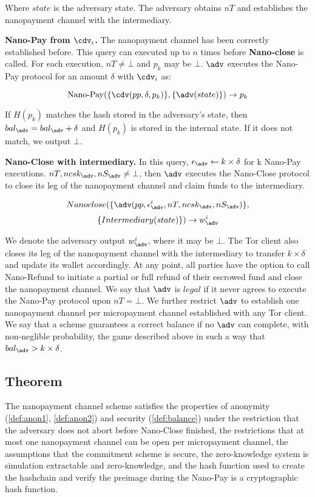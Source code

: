 Where $state$ is the adversary state.
The adversary obtains $nT$ and establishes the nanopayment channel with the intermediary.

\textbf{Nano-Pay from $\cdv_i$.}
The nanopayment channel has been correctly established before.
This query can executed up to $n$ times before \textbf{Nano-close} is called.
For each execution, $nT \neq \bot$ and $p_k$ may be $\bot$.
$\adv$ executes the Nano-Pay protocol for an amount $\delta$ with $\cdv_i$ as:

$$\operatorname{Nano-Pay}(\{\cdv(pp,\delta,p_k)\},\{\adv(state)\}) \rightarrow p_k$$

If $H(p_k)$ matches the hash stored in the adversary's state, then $bal_\adv = bal_\adv+\delta$ and $H(p_k)$ is stored in the internal state.
If it does not match, we output $\bot$.

\textbf{Nano-Close with intermediary.}
In this query, $\epsilon_\adv \leftarrow k \times \delta$ for k Nano-Pay executions.
$nT, ncsk_\adv, nS_\adv \neq \bot$, then $\adv$ executes the Nano-Close protocol to close its leg of the nanopayment channel and claim funds to the intermediary.

$$Nano\-close(\{\adv(pp, \epsilon^i_\adv, nT, ncsk_\adv, nS_\adv)\},$$ $$\{Intermediary(state)\}) \rightarrow w^i_\adv$$

We denote the adversary output $w^i_\adv$, where it may be $\bot$.
The Tor client also closes its leg of the nanopayment channel with the intermediary to transfer $k \times \delta$ and update its wallet accordingly.
At any point, all parties have the option to call Nano-Refund to initiate a partial or full refund of their escrowed fund and close the nanopayment channel.
We say that $\adv$ is $legal$ if it never agrees to execute the Nano-Pay protocol upon $nT = \bot$.
We further restrict $\adv$ to establish one nanopayment channel per micropayment channel established with any Tor client.
We say that a scheme guarantees a correct balance if no $\adv$ can complete, with non-neglible probability, the game described above in such a way that $bal_\adv > k \times \delta$.

\subsection{Theorem}

The nanopayment channel scheme satisfies the properties of anonymity (\ref{def:anon1}, \ref{def:anon2}) and security (\ref{def:balance}) under the restriction that the adversary does not abort before Nano-Close finished, the restrictions that at most one nanopayment channel can be open per micropayment channel, the assumptions that the commitment scheme is secure, the zero-knowledge system is simulation extractable and zero-knowledge, and the hash function used to create the hashchain and verify the preimage during the Nano-Pay is a cryptographic hash function.

